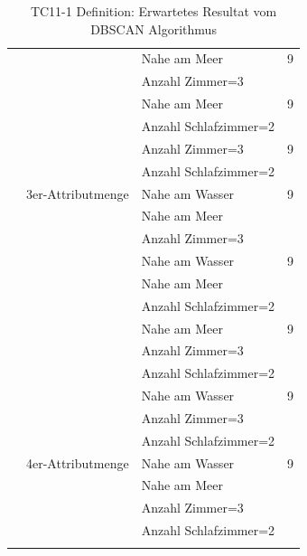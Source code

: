 \begin{longtable}{ | l | l | l | l |}
	& & \tabitem Nahe am Meer & 9 \\
	& & \tabitem Anzahl Zimmer=3 & \\ \cline{3-4} 
	& & \tabitem Nahe am Meer & 9 \\
	& & \tabitem Anzahl Schlafzimmer=2 & \\ \cline{3-4} 

	& & \tabitem Anzahl Zimmer=3 & 9 \\
	& & \tabitem Anzahl Schlafzimmer=2 & \\ \cline{2-4} 

	& 3er-Attributmenge & \tabitem Nahe am Wasser & 9 \\
	& & \tabitem Nahe am Meer & \\ 
	& & \tabitem Anzahl Zimmer=3 & \\ \cline{3-4} 
	& & \tabitem Nahe am Wasser & 9 \\
	& & \tabitem Nahe am Meer & \\ 
	& & \tabitem Anzahl Schlafzimmer=2 & \\ \cline{3-4}
	& & \tabitem Nahe am Meer & 9 \\
	& & \tabitem Anzahl Zimmer=3 & \\ 
	& & \tabitem Anzahl Schlafzimmer=2 & \\ \cline{3-4}
	& & \tabitem Nahe am Wasser & 9 \\
	& & \tabitem Anzahl Zimmer=3 & \\ 
	& & \tabitem Anzahl Schlafzimmer=2 & \\ \cline{2-4}

	& 4er-Attributmenge & \tabitem Nahe am Wasser & 9 \\
	& & \tabitem Nahe am Meer & \\ 
	& & \tabitem Anzahl Zimmer=3 & \\ 
	& & \tabitem Anzahl Schlafzimmer=2 & \\ \hline

	\caption{TC11-1 Definition: Erwartetes Resultat vom DBSCAN Algorithmus}
	\centering
	\label{fig:recherche:testcases:11:1}
\end{longtable}

